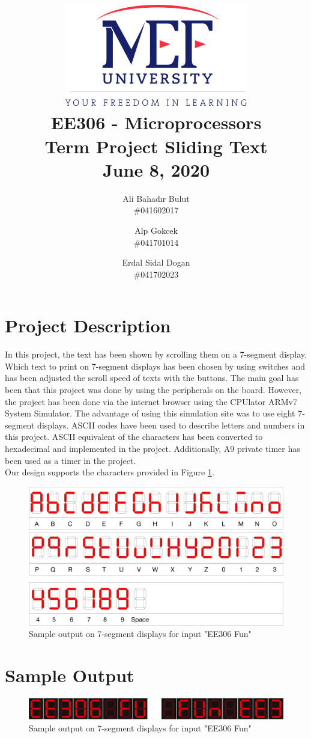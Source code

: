 \documentclass[titlepage]{article}
\date{}
\author{Ali Bahadır Bulut\\ \#041602017  \and Alp
	Gokcek \\ \#041701014 \and Erdal Sidal Dogan \\ \#041702023}
\title{\includegraphics[width=0.6\textwidth]{../images/logo_en_color.png}\\ 
\vspace{5em}
EE306 - Microprocessors\\
\vspace{2em}
\textbf{Term Project \linebreak Sliding Text
}\\
\vspace{1.5em}
June 8, 2020}
\begin{document}
	\maketitle
	\section{Project Description}
	In this project, the text has been shown by scrolling them on a 7-segment display. Which text to print on 7-segment displays has been chosen by using switches and has been adjusted the scroll speed of texts with the buttons. The main goal has been that this project was done by using the peripherals on the board. However, the project has been done via the internet browser using the CPUlator ARMv7 System Simulator. The advantage of using this simulation site was to use eight 7-segment displays. ASCII codes have been used to describe letters and numbers in this project. ASCII equivalent of the characters has been converted to hexadecimal and implemented in the project. Additionally, A9 private timer has been used as a timer in the project.\\
	
	Our design supports the characters provided in Figure \ref{supported_chars}.\\
	
	\begin{figure}[h]
		\centering
		\includegraphics[scale=.1]{../images/supported_chars.pdf}
		\caption{Sample output on 7-segment displays for input "EE306 Fun"}
		\label{supported_chars}
	\end{figure}
	\section{Sample Output}
	\begin{figure}[h!]
		\centering
		\includegraphics[scale=.45]{../images/fig1.png}
		\caption{Sample output on 7-segment displays for input "EE306 Fun"}
	\end{figure}
\end{document}
